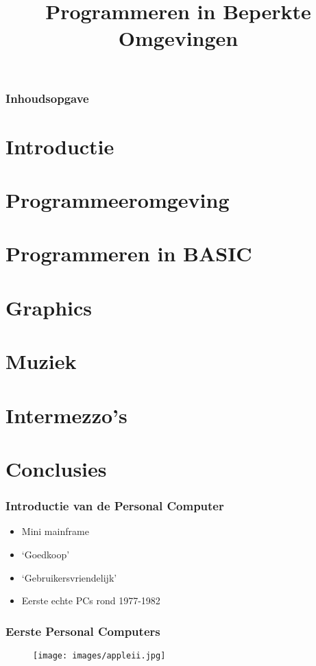 \documentclass[aspectratio=43]{uva-inf-presentation}
\title{Programmeren in Beperkte Omgevingen}
\begin{document}
\begin{titelframe}
\titlepage
\end{titelframe}

\begin{frame}
\frametitle{Inhoudsopgave}
\tableofcontents
\end{frame}

\section{Introductie}
\section{Programmeeromgeving}
\section{Programmeren in BASIC}
\section{Graphics}
\section{Muziek}
\section{Intermezzo's}

\section{Conclusies}


\begin{frame}
\frametitle{Introductie van de Personal Computer}

\begin{itemize}
\item Mini mainframe
\item `Goedkoop'
\item `Gebruikersvriendelijk'
\item Eerste echte PCs rond 1977-1982
\end{itemize}

\end{frame}


\begin{frame}
\frametitle{Eerste Personal Computers}

\begin{figure}
\texttt{[image: images/appleii.jpg]}
\end{figure}

\end{frame}
\end{document}
